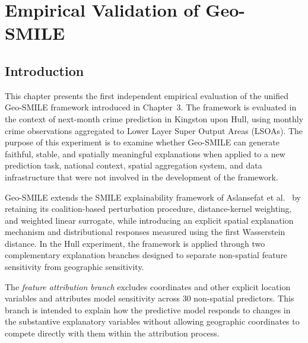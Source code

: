 \chapter{Empirical Validation of Geo-SMILE}
\label{chap:Empirical Validation}
\ifpdf
    \graphicspath{{Chapter4/Figs/Raster/}{Chapter4/Figs/PDF/}{Chapter4/Figs/}}
\else
    \graphicspath{{Chapter4/Figs/Vector/}{Chapter4/Figs/}}
\fi

\section{Introduction}
\label{SEC:hull_intro}

This chapter presents the first independent empirical evaluation of the unified Geo-SMILE framework introduced in Chapter~3. The framework is evaluated in the context of next-month crime prediction in Kingston upon Hull, using monthly crime observations aggregated to Lower Layer Super Output Areas (LSOAs). The purpose of this experiment is to examine whether Geo-SMILE can generate faithful, stable, and spatially meaningful explanations when applied to a new prediction task, national context, spatial aggregation system, and data infrastructure that were not involved in the development of the framework.

Geo-SMILE extends the SMILE explainability framework of Aslansefat et al.\ \cite{aslansefat2021smile} by retaining its coalition-based perturbation procedure, distance-kernel weighting, and weighted linear surrogate, while introducing an explicit spatial explanation mechanism and distributional responses measured using the first Wasserstein distance. In the Hull experiment, the framework is applied through two complementary explanation branches designed to separate non-spatial feature sensitivity from geographic sensitivity.

The \emph{feature attribution branch} excludes coordinates and other explicit location variables and attributes model sensitivity across 30 non-spatial predictors. This branch is intended to explain how the predictive model responds to changes in the substantive explanatory variables without allowing geographic coordinates to compete directly with them within the attribution process.

